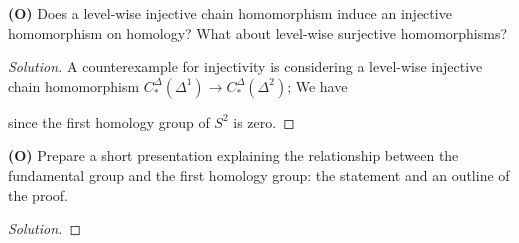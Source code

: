 \newpage

\begin{problem}
\textbf{(O)} Does a level-wise injective chain homomorphism induce an injective homomorphism on homology? What about level-wise surjective homomorphisms?
\end{problem}

\begin{proof}[Solution]
A counterexample for injectivity is considering a level-wise injective chain homomorphism $C^{\Delta}_*(\Delta^1) \to C^{\Delta}_*(\Delta^2)$; We have



since the first homology group of $S^2$ is zero.
\end{proof}

\newpage

\begin{problem}
\textbf{(O)} Prepare a short presentation explaining the relationship between the fundamental group and the first homology group: the statement and an outline of the proof.
\end{problem}

\begin{proof}[Solution]

\end{proof}
